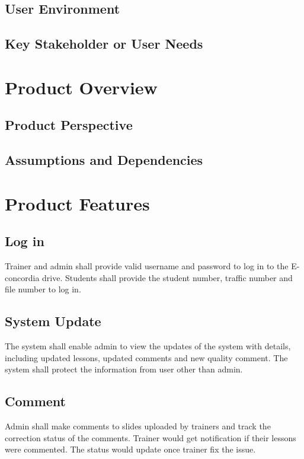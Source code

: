 \documentclass[a4paper]{article}
\begin{document}
\bigskip
\subsection{User Environment}



\bigskip
\subsection{Key Stakeholder or User Needs}



\bigskip
\section{Product Overview}
\subsection{Product Perspective}


\bigskip
\subsection{Assumptions and Dependencies}



\bigskip
\section{Product Features}
\subsection{Log in}
Trainer and admin shall provide valid username and password to log in to the E-concordia drive. 
Students shall provide the student number, traffic number and file number to log in.
\bigskip
\subsection{System Update}
The system shall enable admin to view the updates of the system with details, including updated lessons, updated comments and new quality comment. The system shall protect the information from user other than admin.
\bigskip
\subsection{Comment}
Admin shall make comments to slides uploaded by trainers and track the correction status of the comments.  Trainer would get notification if their lessons were commented. The status would update once trainer fix the issue.
\bigskip
\end{document}
